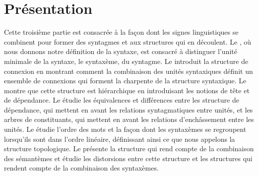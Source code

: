 \section*{Présentation}

Cette troisième partie est consacrée à la façon dont les signes linguistiques se combinent pour former des syntagmes et aux structures qui en découlent. Le , où nous donnons notre définition de la syntaxe, est consacré à distinguer l’unité minimale de la syntaxe, le syntaxème, du syntagme. Le  introduit la structure de connexion en montrant comment la combinaison des unités syntaxiques définit un ensemble de connexions qui forment la charpente de la structure syntaxique. Le  montre que cette structure est hiérarchique en introduisant les notions de tête et de dépendance. Le  étudie les équivalences et différences entre les structure de dépendance, qui mettent en avant les relations syntagmatiques entre unités, et les arbres de constituants, qui mettent en avant les relations d’enchâssement entre les unités. Le  étudie l’ordre des mots et la façon dont les syntaxèmes se regroupent lorsqu’ils sont dans l’ordre linéaire, définissant ainsi ce que nous appelons la structure topologique. Le  présente la structure qui rend compte de la combinaison des sémantèmes et étudie les distorsions entre cette structure et les structures qui rendent compte de la combinaison des syntaxèmes. 
